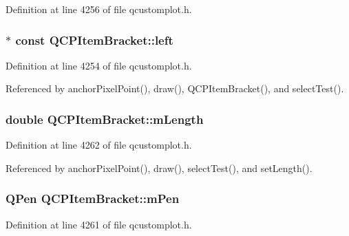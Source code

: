 Definition at line 4256 of file qcustomplot.\+h.

\hypertarget{class_q_c_p_item_bracket_af6cc6d27d96171778c6927d6edce48b0}{}
\subsubsection[{left}]{$\ast$ const Q\+C\+P\+Item\+Bracket\+::left}\label{class_q_c_p_item_bracket_af6cc6d27d96171778c6927d6edce48b0}


Definition at line 4254 of file qcustomplot.\+h.



Referenced by anchor\+Pixel\+Point(), draw(), Q\+C\+P\+Item\+Bracket(), and select\+Test().

\hypertarget{class_q_c_p_item_bracket_ab3d99bba8da18eb4d0e0cb23dded33b2}{}
\subsubsection[{m\+Length}]{\setlength{\rightskip}{0pt plus 5cm}double Q\+C\+P\+Item\+Bracket\+::m\+Length\hspace{0.3cm}{\ttfamily [protected]}}\label{class_q_c_p_item_bracket_ab3d99bba8da18eb4d0e0cb23dded33b2}


Definition at line 4262 of file qcustomplot.\+h.



Referenced by anchor\+Pixel\+Point(), draw(), select\+Test(), and set\+Length().

\hypertarget{class_q_c_p_item_bracket_a350c864a5853b04343719f5a8be6b675}{}
\subsubsection[{m\+Pen}]{\setlength{\rightskip}{0pt plus 5cm}Q\+Pen Q\+C\+P\+Item\+Bracket\+::m\+Pen\hspace{0.3cm}{\ttfamily [protected]}}\label{class_q_c_p_item_bracket_a350c864a5853b04343719f5a8be6b675}


Definition at line 4261 of file qcustomplot.\+h.



